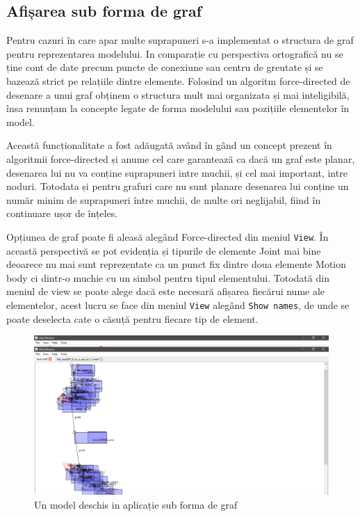 \subsection{Afișarea sub forma de graf}
Pentru cazuri în care apar multe suprapuneri s-a implementat o structura de graf pentru reprezentarea modelului. 
In comparație cu perspectiva ortografică nu se ține cont de date precum puncte de conexiune sau centru de greutate și se bazează 
strict pe relațiile dintre elemente. Folosind un algoritm force-directed de desenare a unui graf obținem o structura mult mai organizata 
și mai inteligibilă, însa renunțam la concepte legate de forma modelului sau pozițiile elementelor în model.\newline

Această funcționalitate a fost adăugată având în gând un concept prezent în algoritmii force-directed și anume cel care garantează ca dacă un graf este planar, desenarea 
lui nu va conține suprapuneri intre muchii, și cel mai important, intre noduri. Totodata și pentru grafuri care nu sunt planare desenarea 
lui conține un număr minim de suprapuneri între muchii, de multe ori neglijabil, fiind în continuare ușor de înțeles.\newline

Opțiunea de graf poate fi aleasă alegând Force-directed din meniul \verb|View|. În această perspectivă se pot evidenția și tipurile de elemente Joint mai bine deoarece nu mai 
sunt reprezentate ca un punct fix dintre doua elemente Motion body ci dintr-o muchie cu un simbol pentru tipul elementului. 
Totodată din meniul de view se poate alege dacă este necesară afișarea fiecărui nume ale elementelor, acest lucru se face din meniul \verb|View| alegând \verb|Show names|, 
de unde se poate deselecta cate o căsuță pentru fiecare tip de element.\newline 

\begin{figure}[H]
    \includegraphics[width=\linewidth]{imagini/implementare/graf.png}
    \caption{Un model deschis in aplicație sub forma de graf}
    \label{fig:tabs}
\end{figure}


